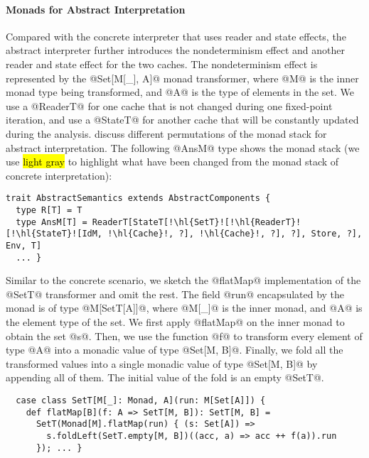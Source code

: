 \paragraph{Monads for Abstract Interpretation}
Compared with the concrete interpreter that uses reader and state effects, the
abstract interpreter further introduces the nondeterminism effect and another
reader and state effect for the two caches. The nondeterminism effect is
represented by the @Set[M[_], A]@ monad transformer, where @M@ is the inner
monad type being transformed, and @A@ is the type of elements in the set. 
We use a @ReaderT@ for one cache that is not changed during one fixed-point
iteration, and use a @StateT@ for another cache that will be constantly updated
during the analysis.
\citet{DBLP:journals/pacmpl/DaraisLNH17} discuss different permutations of the
monad stack for abstract interpretation. The following @AnsM@ type shows the
monad stack (we use \hl{light gray} to highlight what have been changed from
the monad stack of concrete interpretation):
\begin{lstlisting}[escapechar=!]
trait AbstractSemantics extends AbstractComponents {
  type R[T] = T
  type AnsM[T] = ReaderT[StateT[!\hl{SetT}![!\hl{ReaderT}![!\hl{StateT}![IdM, !\hl{Cache}!, ?], !\hl{Cache}!, ?], ?], Store, ?], Env, T]
  ... }
\end{lstlisting}

Similar to the concrete scenario, we sketch the @flatMap@ implementation of the
@SetT@ transformer and omit the rest. The field @run@ encapsulated by the monad
is of type @M[SetT[A]]@, where @M[_]@ is the inner monad, and @A@ is the element
type of the set. We first apply @flatMap@ on the inner monad to obtain the
set @s@. Then, we use the function @f@ to transform every element of type @A@
into a monadic value of type @Set[M, B]@. Finally, we fold all the transformed
values into a single monadic value of type @Set[M, B]@ by appending all of them.
The initial value of the fold is an empty @SetT@.
\begin{lstlisting}
  case class SetT[M[_]: Monad, A](run: M[Set[A]]) {
    def flatMap[B](f: A => SetT[M, B]): SetT[M, B] =
      SetT(Monad[M].flatMap(run) { (s: Set[A]) =>
        s.foldLeft(SetT.empty[M, B])((acc, a) => acc ++ f(a)).run
      }); ... }
\end{lstlisting}


